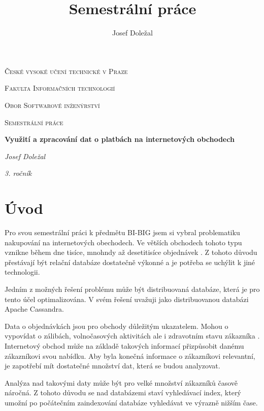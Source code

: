 \documentclass[czech]{article}
\begin{document}
\title{Semestrální práce}
\author{Josef Doležal}

\begin{titlepage}
	\centering
	{\scshape\LARGE České vysoké učení technické v Praze \par}
	{\scshape\Large Fakulta Informačních technologií \par}
	{\scshape\Large Obor Softwarové inženýrství \par}
	\vspace{1.5cm}
	{\scshape\Large Semestrální práce\par}
	\vspace{2cm}
	{\huge\bfseries Využití a zpracování dat o platbách na internetových obchodech\par}
	\vspace{2cm}
	{\Large\itshape Josef Doležal\par}
	{\normalsize\itshape 3. ročník\par}

	\vfill
\end{titlepage}

\newpage

\section{Úvod}

Pro svou semestrální práci k předmětu BI-BIG jsem si vybral problematiku nakupování na internetových obechodech. Ve větších obchodech tohoto typu vznikne během dne tisíce, mnohndy až desetitisíce objednávek \cite{pocet-objednavek}. Z tohoto důvodu přestávají být relační databáze dostatečně výkonné a je potřeba se uchýlit k jiné technologii.

Jedním z možných řešení problému může být distribuovaná databáze, která je pro tento účel optimalizována. V svém řešení uvažuji jako distribuovanou databázi Apache Cassandra.

Data o objednávkách jsou pro obchody důležitým ukazatelem. Mohou o vypovídat o zálibách, volnočasových aktivitách ale i zdravotním stavu zákazníka \cite{predikce-obchodu}. Internetový obchod může na základě takových informací přizpůsobit danému zákazníkovi svou nabídku. Aby byla konečná informace o zákazníkovi relevantní, je zapotřebí mít dostatečné množství dat, která se budou analyzovat.

Analýza nad takovými daty může být pro velké množství zákazníků časově náročná. Z tohoto důvodu se nad databázemi staví vyhledávací index, který umožní po počátečním zaindexování databáze vyhledávat ve výrazně nižším čase.
\end{document}
